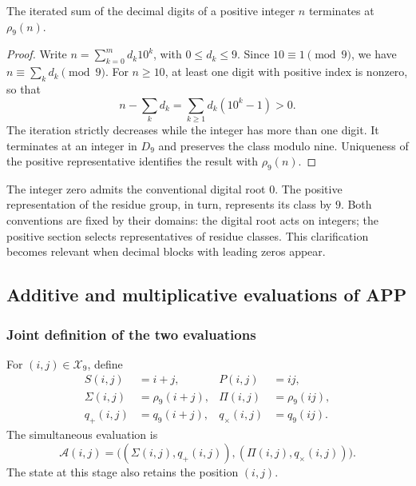 \begin{bloqueindivisible}
\begin{proposicion}
\label{prop:app-raiz-digital}
The iterated sum of the decimal digits of a positive integer $n$ terminates at $\rho_9(n)$.
\end{proposicion}

\begin{proof}
Write $n=\sum_{k=0}^{m}d_k10^k$, with $0\leq d_k\leq9$. Since $10\equiv1\pmod9$, we have $n\equiv\sum_kd_k\pmod9$. For $n\geq10$, at least one digit with positive index is nonzero, so that
\[
 n-\sum_kd_k=\sum_{k\geq1}d_k(10^k-1)>0.
\]
The iteration strictly decreases while the integer has more than one digit. It terminates at an integer in $D_9$ and preserves the class modulo nine. Uniqueness of the positive representative identifies the result with $\rho_9(n)$.
\end{proof}
\end{bloqueindivisible}

The integer zero admits the conventional digital root $0$. The positive representation of the residue group, in turn, represents its class by $9$. Both conventions are fixed by their domains: the digital root acts on integers; the positive section selects representatives of residue classes. This clarification becomes relevant when decimal blocks with leading zeros appear.

\subsection{Additive and multiplicative evaluations of APP}
\label{sec:app-evaluaciones}

\subsubsection{Joint definition of the two evaluations}

\begin{definicion}
\label{def:app-evaluacion}
For $(i,j)\in\mathcal X_9$, define
\begin{align}
 S(i,j)&=i+j, & P(i,j)&=ij,\\
 \Sigma(i,j)&=\rho_9(i+j), & \Pi(i,j)&=\rho_9(ij),\\
 q_+(i,j)&=q_9(i+j), &q_\times(i,j)&=q_9(ij).
\end{align}
The simultaneous evaluation is
\begin{equation}
 \mathcal A(i,j)=\bigl((\Sigma(i,j),q_+(i,j)),
                         (\Pi(i,j),q_\times(i,j))\bigr).
 \label{eq:app-two-evaluations}
\end{equation}
The state at this stage also retains the position $(i,j)$.
\end{definicion}

